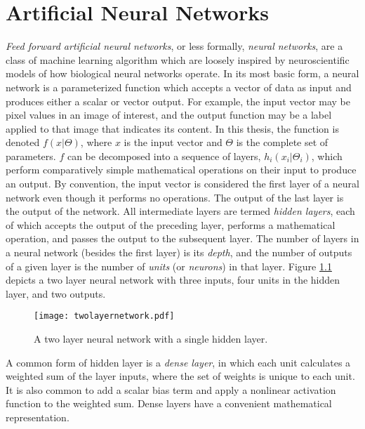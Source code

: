 

\chapter{Artificial Neural Networks}
\label{chap:neuralnetworks}

\textit{Feed forward artificial neural networks}, or less formally, \textit{neural networks}, are a class of machine learning algorithm which are loosely inspired by neuroscientific models of how biological neural networks operate. 
In its most basic form, a neural network is a parameterized function which accepts a vector of data as input and produces either a scalar or vector output.
For example, the input vector may be pixel values in an image of interest, and the output function may be a label applied to that image that indicates its content.
In this thesis, the function is denoted $f(x|\Theta)$, where $x$ is the input vector and $\Theta$ is the complete set of parameters.
$f$ can be decomposed into a sequence of layers, $h_i(x_i|\Theta_i)$, which perform comparatively simple mathematical operations on their input to produce an output.
By convention, the input vector is considered the first layer of a neural network even though it performs no operations. 
The output of the last layer is the output of the network. 
All intermediate layers are termed \textit{hidden layers}, each of which accepts the output of the preceding layer, performs a mathematical operation, and passes the output to the subsequent layer.
The number of layers in a neural network (besides the first layer) is its \textit{depth}, and the number of outputs of a given layer is the number of \textit{units} (or \textit{neurons}) in that layer.
Figure \ref{fig:twolayernetwork} depicts a two layer neural network with three inputs, four units in the hidden layer, and two outputs. 

\begin{figure}
	\centering
	\texttt{[image: twolayernetwork.pdf]}
	\caption{A two layer neural network with a single hidden layer.}
	\label{fig:twolayernetwork}
\end{figure}

A common form of hidden layer is a \textit{dense layer}, in which each unit calculates a weighted sum of the layer inputs, where the set of weights is unique to each unit.
It is also common to add a scalar bias term and apply a nonlinear activation function to the weighted sum.
Dense layers have a convenient mathematical representation.

